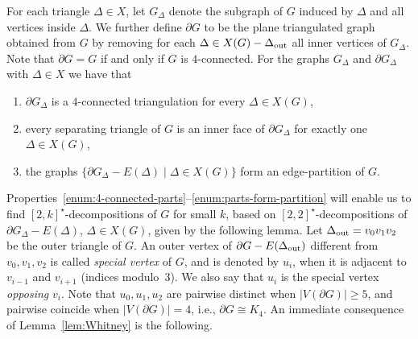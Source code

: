 \documentclass[a4paper,10pt]{article}
\theoremstyle{plain}
\renewcommand{\outer}[1]{\partial{#1}}
\begin{document}
For each triangle $\Delta \in X$, let $G_\Delta$ denote the subgraph of $G$ induced by $\Delta$ and all vertices inside $\Delta$.
We further define $\outer{G}$ to be the plane triangulated graph obtained from $G$ by removing for each $\Delta \in X(G) - \Delta_{\rm out}$ all inner vertices of $G_\Delta$.
Note that $\outer{G} = G$ if and only if $G$ is $4$-connected.
For the graphs $G_\Delta$ and $\outer{G_\Delta}$ with $\Delta \in X$ we have that
% 
\begin{enumerate}[label = \textbf{(P\arabic*)}]
 \item $\outer{G_\Delta}$ is a $4$-connected triangulation for every $\Delta \in X(G)$,\label{enum:4-connected-parts}
 
 \item every separating triangle of $G$ is an inner face of $\outer{G_\Delta}$ for exactly one $\Delta \in X(G)$,\label{enum:separating-triangles-are-faces}
 
 \item the graphs $\{\outer{G_\Delta} - E(\Delta) \mid \Delta \in X(G)\}$ form an edge-partition of $G$.\label{enum:parts-form-partition}
\end{enumerate}
% 
Properties~\ref{enum:4-connected-parts}--\ref{enum:parts-form-partition} will enable us to find $[2,k]^\star$-decompositions of $G$ for small $k$, based on $[2,2]^\star$-decompositions of $\outer{G_\Delta} - E(\Delta)$, $\Delta \in X(G)$, given by the following lemma.
Let $\Delta_{\rm out} = v_0v_1v_2$ be the outer triangle of $G$.
An outer vertex of $\outer{G} - E(\Delta_{\rm out})$ different from $v_0,v_1,v_2$ is called \emph{special vertex} of $G$, and is denoted by $u_i$, when it is adjacent to $v_{i-1}$ and $v_{i+1}$ (indices modulo~$3$). We also say that $u_i$ is the special vertex \emph{opposing} $v_i$.
Note that $u_0,u_1,u_2$ are pairwise distinct when $|V(\outer{G})| \geq 5$, and pairwise coincide when $|V(\outer{G})| = 4$, i.e., $\outer{G}\cong K_4$. An immediate consequence of Lemma~\ref{lem:Whitney} is the following. 
\end{document}
